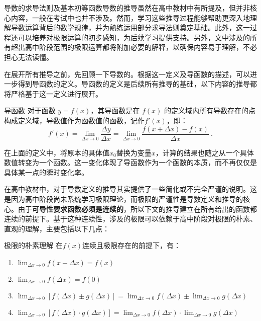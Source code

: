 导数的求导法则及基本初等函数导数的推导虽然在高中教材中有所提及，但并非核心内容，一般在考试中也并不涉及。然而，学习这些推导过程能够帮助更深入地理解导数运算背后的数学规律，并为熟练运用部分求导法则奠定基础。此外，这一过程还可以培养对极限运算的初步感知，为后续学习提供支持。另外，文中涉及的所有超出高中阶段范围的极限运算都将附加必要的解释，以确保内容易于理解，不必担心无法读懂。

在展开所有推导之前，先回顾一下导数的。根据这一定义及导函数的描述，可以进一步得到导函数的定义。导函数的定义是后续所有推导的基础，以下内容的推导都将严格基于这一定义进行展开。

\begin{definition}{导函数}\label{def_HsDerB_1}
对于函数 $y=f(x)$，其导函数是在 $f(x)$ 的定义域内所有导数存在的点构成定义域，导数值作为函数值的函数，记作$f'(x)$，即：
\begin{equation}
f'(x)=\lim_{\Delta x\to 0}\frac{\Delta y}{\Delta x}=\lim_{\Delta x\to0}\frac{f(x+\Delta x)-f(x)}{\Delta x}~.
\end{equation}
\end{definition}

在上面的定义中，将原本的具体值$x_0$替换为变量$x$，计算的结果也随之从一个具体数值转变为一个函数。这一变化体现了导函数作为一个函数的本质，而不再仅仅是具体某一点的瞬时变化率。

在高中教材中，对于导数定义的推导其实提供了一些简化或不完全严谨的说明。这是因为高中阶段尚未系统学习极限理论，而极限的严谨性是导数定义和推导的核心。由于\textbf{可导性要求函数必须是连续的}，所以下文的推导建立在所有给出的函数都连续的前提下。基于这种连续性，涉及的极限可以依赖于高中阶段对极限的朴素、直观的理解，主要包括以下几点：

\begin{lemma}{极限的朴素理解}\label{lem_HsDerB_1}
在$f(x)$连续且极限存在的前提下，有：
\begin{enumerate}
\item $\displaystyle\lim_{\Delta x\to 0}f(x+\Delta x)=f(x)$
\item $\displaystyle\lim_{\Delta x\to 0}f(\Delta x)=f(0)$
\item $\displaystyle\lim_{\Delta x\to 0}[f(\Delta x)\pm g(\Delta x)]=\lim_{\Delta x\to 0}f(\Delta x)\pm \lim_{\Delta x\to 0}g(\Delta x)$
\item $\displaystyle\lim_{\Delta x\to 0}[f(\Delta x)\cdot g(\Delta x)]=\lim_{\Delta x\to 0}f(\Delta x)\cdot\lim_{\Delta x\to 0}g(\Delta x)$
\end{enumerate}
\end{lemma}

